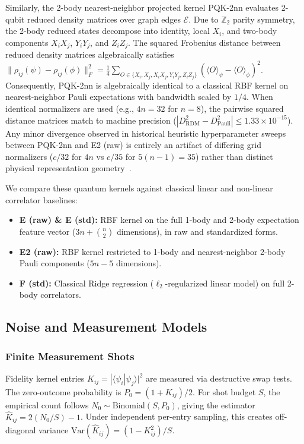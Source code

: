 \documentclass[conference]{IEEEtran}
\begin{document}
Similarly, the 2-body nearest-neighbor projected kernel PQK-2nn evaluates 2-qubit reduced density matrices over graph edges $\mathcal{E}$. Due to $\mathbb{Z}_2$ parity symmetry, the 2-body reduced states decompose into identity, local $X_i$, and two-body components $X_i X_j$, $Y_i Y_j$, and $Z_i Z_j$. The squared Frobenius distance between reduced density matrices algebraically satisfies $\|\rho_{ij}(\psi) - \rho_{ij}(\phi)\|_F^2 = \frac{1}{4}\sum_{O \in \{X_i, X_j, X_i X_j, Y_i Y_j, Z_i Z_j\}} (\langle O \rangle_\psi - \langle O \rangle_\phi)^2$. Consequently, PQK-2nn is algebraically identical to a classical RBF kernel on nearest-neighbor Pauli expectations with bandwidth scaled by $1/4$. When identical normalizers are used (e.g., $4n=32$ for $n=8$), the pairwise squared distance matrices match to machine precision ($|D^2_{\mathrm{RDM}} - D^2_{\mathrm{Pauli}}| \le 1.33 \times 10^{-15}$). Any minor divergence observed in historical heuristic hyperparameter sweeps between PQK-2nn and E2 (raw) is entirely an artifact of differing grid normalizers ($c/32$ for $4n$ vs $c/35$ for $5(n-1)=35$) rather than distinct physical representation geometry~\cite{Canatar2023bandwidth}.

We compare these quantum kernels against classical linear and non-linear correlator baselines:
\begin{itemize}
    \item \textbf{E (raw) \& E (std):} RBF kernel on the full 1-body and 2-body expectation feature vector ($3n + \binom{n}{2}$ dimensions), in raw and standardized forms.
    \item \textbf{E2 (raw):} RBF kernel restricted to 1-body and nearest-neighbor 2-body Pauli components ($5n-5$ dimensions).
    \item \textbf{F (std):} Classical Ridge regression ($\ell_2$-regularized linear model) on full 2-body correlators.
\end{itemize}

\subsection{Noise and Measurement Models}
\subsubsection{Finite Measurement Shots}
Fidelity kernel entries $K_{ij} = |\langle \psi_i | \psi_j \rangle|^2$ are measured via destructive swap tests. The zero-outcome probability is $P_0 = (1 + K_{ij})/2$. For shot budget $S$, the empirical count follows $N_0 \sim \text{Binomial}(S, P_0)$, giving the estimator $\hat{K}_{ij} = 2(N_0/S) - 1$. Under independent per-entry sampling, this creates off-diagonal variance $\text{Var}(\hat{K}_{ij}) = (1 - K_{ij}^2)/S$.
\end{document}

